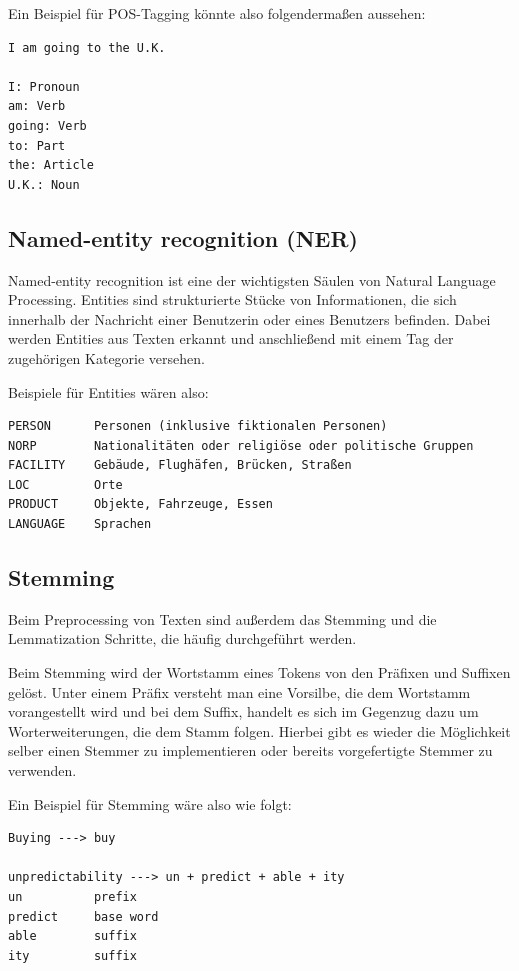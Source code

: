 Ein Beispiel für POS-Tagging könnte also folgendermaßen aussehen:

\begin{lstlisting}[label={lst: POS-Tagging}]
I am going to the U.K.

I: Pronoun
am: Verb
going: Verb
to: Part
the: Article
U.K.: Noun
\end{lstlisting}

\subsection{Named-entity recognition (NER)}

Named-entity recognition ist eine der wichtigsten Säulen von Natural Language Processing.
Entities sind strukturierte Stücke von Informationen, die sich innerhalb der Nachricht einer Benutzerin oder eines Benutzers befinden.
Dabei werden Entities aus Texten erkannt und anschließend mit einem Tag der zugehörigen Kategorie versehen.\cite{namedEntityRecognition}

Beispiele für Entities wären also:

\begin{lstlisting}[label={lst: NER-Tagging}]
PERSON      Personen (inklusive fiktionalen Personen)
NORP        Nationalitäten oder religiöse oder politische Gruppen
FACILITY    Gebäude, Flughäfen, Brücken, Straßen
LOC         Orte
PRODUCT     Objekte, Fahrzeuge, Essen
LANGUAGE    Sprachen
\end{lstlisting}

\subsection{Stemming}

Beim Preprocessing von Texten sind außerdem das Stemming und die Lemmatization Schritte, die häufig durchgeführt werden.

Beim Stemming wird der Wortstamm eines Tokens von den Präfixen und Suffixen gelöst.
Unter einem Präfix versteht man eine Vorsilbe, die dem Wortstamm vorangestellt wird und bei dem Suffix, handelt es sich im Gegenzug dazu um Worterweiterungen, die dem Stamm folgen.
Hierbei gibt es wieder die Möglichkeit selber einen Stemmer zu implementieren oder bereits vorgefertigte Stemmer zu verwenden.\cite{textAnalysisMonkeylearn, machineLearningTextAnalysis}

Ein Beispiel für Stemming wäre also wie folgt:

\begin{lstlisting}[label={lst: Stemming}]
Buying ---> buy

unpredictability ---> un + predict + able + ity
un          prefix
predict     base word
able        suffix
ity         suffix
\end{lstlisting}

